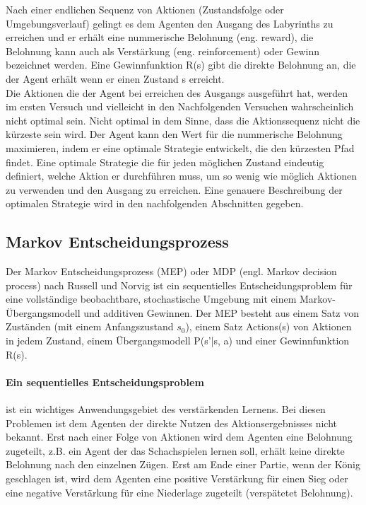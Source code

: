 Nach einer endlichen Sequenz von Aktionen (Zustandsfolge oder Umgebungsverlauf) gelingt es dem Agenten den Ausgang des Labyrinths zu erreichen und er erhält eine nummerische Belohnung (eng. reward), die Belohnung kann auch als Verstärkung (eng. reinforcement) oder Gewinn bezeichnet werden. Eine Gewinnfunktion R(s) gibt die direkte Belohnung an, die der Agent erhält wenn er einen Zustand s erreicht. \\

Die Aktionen die der Agent bei erreichen des Ausgangs ausgeführt hat, werden im ersten Versuch und vielleicht in den Nachfolgenden Versuchen wahrscheinlich nicht optimal sein. Nicht optimal in dem Sinne, dass die Aktionssequenz nicht die kürzeste sein wird. Der Agent kann den Wert für die nummerische Belohnung maximieren, indem er eine optimale Strategie entwickelt, die den kürzesten Pfad findet. Eine optimale Strategie die für jeden möglichen Zustand eindeutig definiert, welche Aktion er durchführen muss, um so wenig wie möglich Aktionen zu verwenden und den Ausgang zu erreichen. Eine genauere Beschreibung der optimalen Strategie wird in den nachfolgenden Abschnitten gegeben.\\

\subsection{Markov Entscheidungsprozess}
\label{subsec:Markov Entscheidungsprozess}
Der Markov Entscheidungsprozess (MEP) oder MDP (engl. Markov decision process) nach Russell und Norvig \cite[752 \psqq]{Russell} ist ein sequentielles Entscheidungsproblem für eine vollständige beobachtbare, stochastische Umgebung mit einem Markov-Übergangsmodell und additiven Gewinnen. Der MEP besteht aus einem Satz von Zuständen (mit einem Anfangszustand $s_0$), einem Satz Actions(s) von Aktionen in jedem Zustand, einem Übergangsmodell P(s'|s, a) und einer Gewinnfunktion R(s). 

\paragraph{Ein sequentielles Entscheidungsproblem} ist ein wichtiges Anwendungsgebiet des verstärkenden Lernens. Bei diesen Problemen ist dem Agenten der direkte Nutzen des Aktionsergebnisses nicht bekannt. Erst nach einer Folge von Aktionen wird dem Agenten eine Belohnung zugeteilt, z.B. ein Agent der das Schachspielen lernen soll, erhält keine direkte Belohnung nach den einzelnen Zügen. Erst am Ende einer Partie, wenn der König geschlagen ist, wird dem Agenten eine positive Verstärkung für einen Sieg oder eine negative Verstärkung für eine Niederlage zugeteilt (verspätetet Belohnung).


